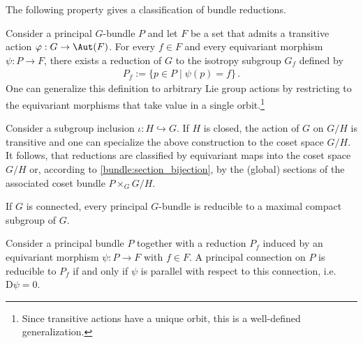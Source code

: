     The following property gives a classification of bundle reductions.
    \begin{property}\label{bundle:reduction_classification}
        Consider a principal $G$-bundle $P$ and let $F$ be a set that admits a transitive action $\varphi:G\rightarrow\Aut(F)$. For every $f\in F$ and every equivariant morphism $\psi:P\rightarrow F$, there exists a reduction of $G$ to the isotropy subgroup $G_f$ defined by
        \begin{gather}
            P_f := \{p\in P\mid\psi(p) = f\}\,.
        \end{gather}
        One can generalize this definition to arbitrary Lie group actions by restricting to the equivariant morphisms that take value in a single orbit.\footnote{Since transitive actions have a unique orbit, this is a well-defined generalization.}

        Consider a subgroup inclusion $\iota:H\hookrightarrow G$. If $H$ is closed, the action of $G$ on $G/H$ is transitive and one can specialize the above construction to the coset space $G/H$. It follows, that reductions are classified by equivariant maps into the coset space $G/H$ or, according to \cref{bundle:section_bijection}, by the (global) sections of the associated coset bundle $P\times_GG/H$.
    \end{property}
    \begin{result}
        If $G$ is connected, every principal $G$-bundle is reducible to a maximal compact subgroup of $G$.
    \end{result}

    \begin{property}\label{bundle:connection_reducibility}
        Consider a principal bundle $P$ together with a reduction $P_f$ induced by an equivariant morphism $\psi:P\rightarrow F$ with $f\in F$. A principal connection on $P$ is reducible to $P_f$ if and only if $\psi$ is parallel with respect to this connection, i.e.~$\mathrm{D}\psi=0$.
    \end{property}

